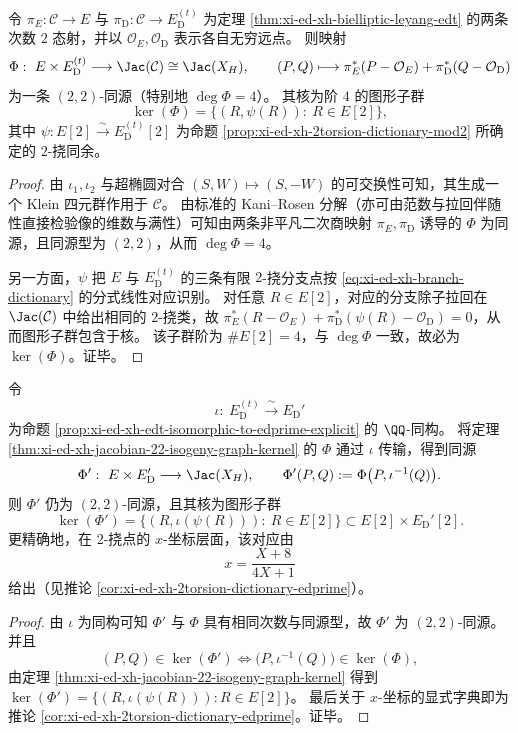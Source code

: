 \begin{theorem}\label{thm:xi-ed-xh-jacobian-22-isogeny-graph-kernel}
令 \(\pi_E:\mathcal C\to E\) 与 \(\pi_{\mathrm D}:\mathcal C\to E_{\mathrm D}^{(t)}\) 为定理 \ref{thm:xi-ed-xh-bielliptic-leyang-edt} 的两条次数 \(2\) 态射，并以 \(\mathcal O_E,\mathcal O_{\mathrm D}\) 表示各自无穷远点。
则映射
\[
\Phi:\ E\times E_{\mathrm D}^{(t)}\longrightarrow \Jac(\mathcal C)\cong \Jac(X_H),
\qquad
(P,Q)\longmapsto \pi_E^*(P-\mathcal O_E)+\pi_{\mathrm D}^*(Q-\mathcal O_{\mathrm D})
\]
为一条 \((2,2)\)-同源（特别地 \(\deg\Phi=4\)）。
其核为阶 \(4\) 的图形子群
\[
\ker(\Phi)=\{(R,\psi(R)):\ R\in E[2]\},
\]
其中 \(\psi:E[2]\xrightarrow{\sim}E_{\mathrm D}^{(t)}[2]\) 为命题 \ref{prop:xi-ed-xh-2torsion-dictionary-mod2} 所确定的 \(2\)-挠同余。
\end{theorem}
\begin{proof}
由 \(\iota_1,\iota_2\) 与超椭圆对合 \((S,W)\mapsto(S,-W)\) 的可交换性可知，其生成一个 Klein 四元群作用于 \(\mathcal C\)。
由标准的 Kani--Rosen 分解（亦可由范数与拉回伴随性直接检验像的维数与满性）可知由两条非平凡二次商映射 \(\pi_E,\pi_{\mathrm D}\) 诱导的 \(\Phi\) 为同源，且同源型为 \((2,2)\)，从而 \(\deg\Phi=4\)。
\par
另一方面，\(\psi\) 把 \(E\) 与 \(E_{\mathrm D}^{(t)}\) 的三条有限 \(2\)-挠分支点按 \eqref{eq:xi-ed-xh-branch-dictionary} 的分式线性对应识别。
对任意 \(R\in E[2]\)，对应的分支除子拉回在 \(\Jac(\mathcal C)\) 中给出相同的 \(2\)-挠类，故
\(\pi_E^*(R-\mathcal O_E)+\pi_{\mathrm D}^*(\psi(R)-\mathcal O_{\mathrm D})=0\)，从而图形子群包含于核。
该子群阶为 \(\#E[2]=4\)，与 \(\deg\Phi\) 一致，故必为 \(\ker(\Phi)\)。证毕。
\end{proof}

\begin{corollary}\label{cor:xi-ed-xh-jacobian-22-isogeny-edprime-kernel}
令
\[
\iota:\ E_{\mathrm D}^{(t)}\xrightarrow{\ \sim\ }E_{\mathrm D}'
\]
为命题 \ref{prop:xi-ed-xh-edt-isomorphic-to-edprime-explicit} 的 \(\QQ\)-同构。
将定理 \ref{thm:xi-ed-xh-jacobian-22-isogeny-graph-kernel} 的 \(\Phi\) 通过 \(\iota\) 传输，得到同源
\[
\Phi':\ E\times E_{\mathrm D}'\longrightarrow \Jac(X_H),
\qquad
\Phi'(P,Q):=\Phi\bigl(P,\iota^{-1}(Q)\bigr).
\]
则 \(\Phi'\) 仍为 \((2,2)\)-同源，且其核为图形子群
\[
\ker(\Phi')=\{(R,\iota(\psi(R))):\ R\in E[2]\}\subset E[2]\times E_{\mathrm D}'[2].
\]
更精确地，在 \(2\)-挠点的 \(x\)-坐标层面，该对应由
\[
x=\frac{X+8}{4X+1}
\]
给出（见推论 \ref{cor:xi-ed-xh-2torsion-dictionary-edprime}）。
\end{corollary}
\begin{proof}
由 \(\iota\) 为同构可知 \(\Phi'\) 与 \(\Phi\) 具有相同次数与同源型，故 \(\Phi'\) 为 \((2,2)\)-同源。
并且
\[
(P,Q)\in \ker(\Phi')
\iff
\bigl(P,\iota^{-1}(Q)\bigr)\in \ker(\Phi),
\]
由定理 \ref{thm:xi-ed-xh-jacobian-22-isogeny-graph-kernel} 得到
\(
\ker(\Phi')=\{(R,\iota(\psi(R))):R\in E[2]\}
\)。
最后关于 \(x\)-坐标的显式字典即为推论 \ref{cor:xi-ed-xh-2torsion-dictionary-edprime}。证毕。
\end{proof}

